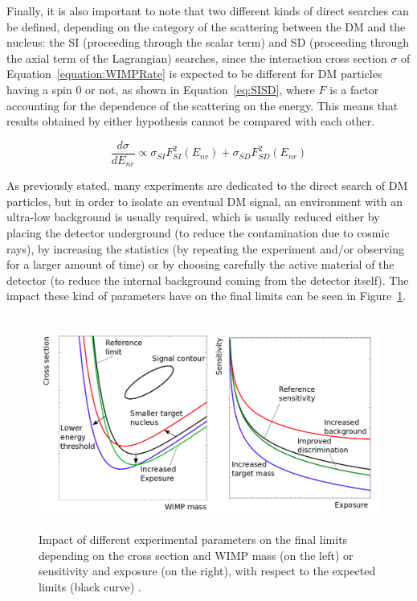 \documentclass[a4paper, 10pt, openright]{report}
\begin{document}
Finally, it is also important to note that two different kinds of direct searches can be defined, depending on the category of the scattering between the \ac{DM} and the nucleus: the \acf{SI} (proceeding through the scalar term) and \acf{SD} (proceeding through the axial term of the Lagrangian) searches, since the interaction cross section $\sigma$ of Equation~\ref{equation:WIMPRate} is expected to be different for \ac{DM} particles having a spin 0 or not, as shown in Equation~\ref{eq:SISD}, where $F$ is a factor accounting for the dependence of the scattering on the energy. This means that results obtained by either hypothesis cannot be compared with each other.

\begin{equation}
\label{eq:SISD}
\frac{d\sigma}{dE_{nr}} \propto \sigma_{SI} F_{SI}^2(E_{nr}) + \sigma_{SD} F_{SD}^2(E_{nr})
\end{equation}

As previously stated, many experiments are dedicated to the direct search of \ac{DM} particles, but in order to isolate an eventual \ac{DM} signal, an environment with an ultra-low background is usually required, which is usually reduced either by placing the detector underground (to reduce the contamination due to cosmic rays), by increasing the statistics (by repeating the experiment and/or observing for a larger amount of time) or by choosing carefully the active material of the detector (to reduce the internal background coming from the detector itself). The impact these kind of parameters have on the final limits can be seen in Figure~\ref{fig:ImpactLimit}.

\begin{figure}[htbp]
\begin{center}
\includegraphics[width=14cm, height=7cm]{figs/ImpactLimits.png}
\caption{Impact of different experimental parameters on the final limits depending on the cross section and \ac{WIMP} mass (on the left) or sensitivity and exposure (on the right), with respect to the expected limits (black curve) \cite{DirectWays}.}
\label{fig:ImpactLimit}
\end{center}
\end{figure}
\end{document}
